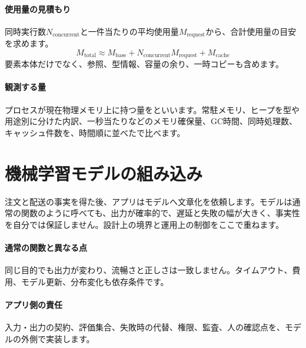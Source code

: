 \par
\endgroup
\medskip
\begingroup
\begin{samepage}
\paragraph{使用量の見積もり}
        同時実行数$N_{\mathrm{concurrent}}$と一件当たりの平均使用量$M_{\mathrm{request}}$から、合計使用量の目安を求めます。
        \[
          M_{\mathrm{total}} \approx
          M_{\mathrm{base}} + N_{\mathrm{concurrent}}M_{\mathrm{request}}
          + M_{\mathrm{cache}}
        \]
        要素本体だけでなく、参照、型情報、容量の余り、一時コピーも含めます。
\end{samepage}

\paragraph{観測する量}
        プロセスが現在物理メモリ上に持つ量をといいます。常駐メモリ、ヒープを型や用途別に分けた内訳、一秒当たりなどのメモリ確保量、GC時間、同時処理数、キャッシュ件数を、時間順に並べたで比べます。

\par
\endgroup
\par
\endgroup


\section{機械学習モデルの組み込み}
\label{sec:07-practice-06}

注文と配送の事実を得た後、アプリはモデルへ文章化を依頼します。モデルは通常の関数のように呼べても、出力が確率的で、遅延と失敗の幅が大きく、事実性を自分では保証しません。設計上の境界と運用上の制御をここで重ねます。

\begingroup
  \centering
  \vspace{6mm}
\begingroup
\paragraph{通常の関数と異なる点}
        同じ目的でも出力が変わり、流暢さと正しさは一致しません。タイムアウト、費用、モデル更新、分布変化も依存条件です。

\par
\endgroup
\medskip
\begingroup
\paragraph{アプリ側の責任}
        入力・出力の契約、評価集合、失敗時の代替、権限、監査、人の確認点を、モデルの外側で実装します。

